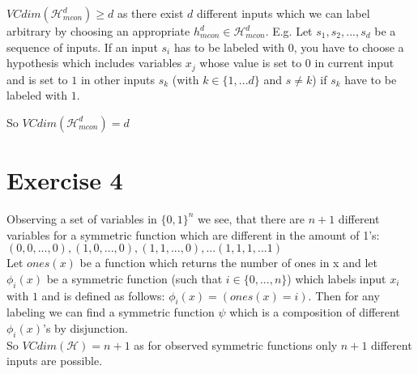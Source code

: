 \documentclass{article}
\begin{document}
$VCdim(\mathcal{H}_{mcon}^d) \geq d$ as
there exist $d$ different inputs which we can label arbitrary by choosing an appropriate $h_{mcon}^d \in \mathcal{H}_{mcon}^d$. E.g. Let $s_1, s_2, ..., s_{d}$ be a sequence of inputs. If an input $s_i$ has to be labeled with $0$, you have to choose a hypothesis which includes variables $x_j$ whose value is set to $0$ in current input and is set to $1$ in other inputs $s_k$ (with $k \in \{1, ... d\}$ and $s\neq k$) if $s_k$ have to be labeled with $1$.

So $VCdim(\mathcal{H}_{mcon}^d) = d$ 



\section*{Exercise 4}
Observing a set of variables in $\{0,1\}^n$ we see, that there are $n+1$ different variables for a symmetric function which are different in the amount of 1's: \\ ${(0,0,..., 0), (1,0,..., 0), (1,1,..., 0), ... (1,1,1, ... 1)}$ \\
Let $ones(x)$ be a function which returns the number of ones in x and let $\phi_i(x)$ be a symmetric function (such that $i\in\{0,..., n\}$) which labels input $x_i$ with $1$ and is defined as follows:
$\phi_i(x) = (ones(x) = i)$.
Then for any labeling we can find a symmetric function $\psi$ which is a composition of different  $\phi_i(x)$'s by disjunction. \\
So $VCdim(\mathcal{H}) = n+1$ as for observed symmetric functions only $n+1$ different inputs are possible.
\end{document}
